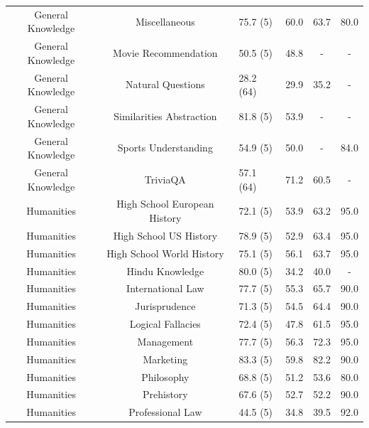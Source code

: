 \documentclass[11pt, a4paper, logo, internal, copyright, nonumbering]{deepmind}
\begin{document}
\begin{center}
\begin{longtable}{cclccc}
      General Knowledge &                        Miscellaneous &   75.7 (5) &  60.0 &  63.7 &         80.0 \\
      General Knowledge &                  Movie Recommendation &   50.5 (5) &  48.8 &   - &          - \\
      General Knowledge &                    Natural Questions &   28.2 (64) &  29.9 &  35.2 &          - \\
      General Knowledge &              Similarities Abstraction &   81.8 (5) &  53.9 &   - &          - \\
      General Knowledge &                  Sports Understanding &   54.9 (5) &  50.0 &   - &         84.0 \\
      General Knowledge &                             TriviaQA &   57.1 (64) &  71.2 &  60.5 &          - \\
             Humanities &         High School European History &   72.1 (5) &  53.9 &  63.2 &         95.0 \\
             Humanities &               High School US History &   78.9 (5) &  52.9 &  63.4 &         95.0 \\
             Humanities &            High School World History &   75.1 (5) &  56.1 &  63.7 &         95.0 \\
             Humanities &                     Hindu Knowledge &   80.0 (5) &  34.2 &  40.0 &          - \\
             Humanities &                    International Law &   77.7 (5) &  55.3 &  65.7 &         90.0 \\
             Humanities &                        Jurisprudence &   71.3 (5) &  54.5 &  64.4 &         90.0 \\
             Humanities &                    Logical Fallacies &   72.4 (5) &  47.8 &  61.5 &         95.0 \\
             Humanities &                           Management &   77.7 (5) &  56.3 &  72.3 &         95.0 \\
             Humanities &                            Marketing &   83.3 (5) &  59.8 &  82.2 &         90.0 \\
             Humanities &                           Philosophy &   68.8 (5) &  51.2 &  53.6 &         80.0 \\
             Humanities &                           Prehistory &   67.6 (5) &  52.7 &  52.2 &         90.0 \\
             Humanities &                     Professional Law &   44.5 (5) &  34.8 &  39.5 &         92.0 \\

\end{longtable}
\end{center}
\end{document}
